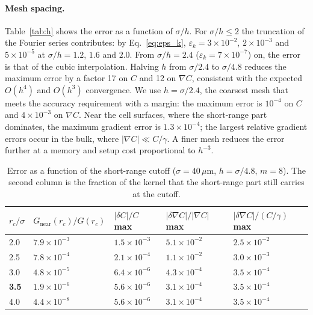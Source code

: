 \documentclass[11pt,a4paper]{article}
\newcommand{\um}{\,\mu\mathrm{m}}
\begin{document}
\paragraph{Mesh spacing.} Table~\ref{tab:h} shows the error as a function of $\sigma/h$. For
$\sigma/h \le 2$ the truncation of the Fourier series contributes: by Eq.~\eqref{eq:eps_k},
$\varepsilon_k = 3\times10^{-2}$, $2\times10^{-3}$ and $5\times10^{-5}$ at $\sigma/h = 1.2$, $1.6$
and $2.0$. From $\sigma/h = 2.4$ ($\varepsilon_k = 7\times10^{-7}$) on, the error is that of the
cubic interpolation. Halving $h$ from $\sigma/2.4$ to $\sigma/4.8$ reduces the maximum error by a
factor 17 on $C$ and 12 on $\nabla C$, consistent with the expected $O(h^4)$ and $O(h^3)$
convergence. We use $h = \sigma/2.4$, the coarsest mesh that meets the accuracy requirement with a
margin: the maximum error is $10^{-4}$ on $C$ and $4\times10^{-3}$ on $\nabla C$. Near the cell
surfaces, where the short-range part dominates, the maximum gradient error is $1.3\times10^{-4}$;
the largest relative gradient errors occur in the bulk, where $|\nabla C| \ll C/\gamma$. A finer
mesh reduces the error further at a memory and setup cost proportional to $h^{-3}$.

\begin{table}[h]
  \centering\small
  \begin{tabular}{lllll}
    \toprule
    $r_c/\sigma$ & $G_{\mathrm{near}}(r_c)/G(r_c)$ & $|\delta C|/C$ max & $|\delta\nabla C|/|\nabla C|$ max & $|\delta\nabla C|/(C/\gamma)$ max \\
    \midrule
    2.0 & $7.9\times10^{-3}$ & $1.5\times10^{-3}$ & $5.1\times10^{-2}$ & $2.5\times10^{-2}$ \\
    2.5 & $7.8\times10^{-4}$ & $2.1\times10^{-4}$ & $1.1\times10^{-2}$ & $3.0\times10^{-3}$ \\
    3.0 & $4.8\times10^{-5}$ & $6.4\times10^{-6}$ & $4.3\times10^{-4}$ & $3.5\times10^{-4}$ \\
    \textbf{3.5} & $1.9\times10^{-6}$ & $5.6\times10^{-6}$ & $3.1\times10^{-4}$ & $3.5\times10^{-4}$ \\
    4.0 & $4.4\times10^{-8}$ & $5.6\times10^{-6}$ & $3.1\times10^{-4}$ & $3.5\times10^{-4}$ \\
    \bottomrule
  \end{tabular}
  \caption{Error as a function of the short-range cutoff ($\sigma = 40\um$, $h = \sigma/4.8$,
    $m = 8$). The second column is the fraction of the kernel that the short-range part still
    carries at the cutoff.}
  \label{tab:rc}
\end{table}
\end{document}

